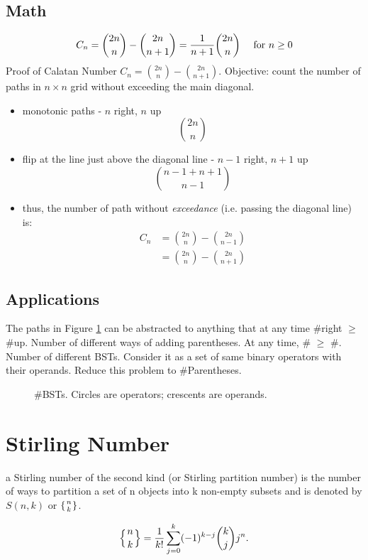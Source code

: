 \subsection{Math}
$$
C_n = {2n\choose n} - {2n\choose n+1} = {1\over n+1}{2n\choose n} \quad\text{ for }n\ge 0
$$
 Proof of Calatan Number $C_n ={2n\choose n} - {2n\choose n+1}$. Objective: count the number of paths in $n\times n$ grid without exceeding the main diagonal. 
\begin{itemize}
\begin{figure}[]
    \centerline{\texttt{[image: catalan\_proof]}}
    \caption{Monotonic Paths}
  \label{fig:catalanProof}
\end{figure}
\item monotonic paths - $n$ right, $n$ up
$$
{2n\choose n}
$$
\item flip at the line just above the diagonal line - $n-1$ right, $n+1$ up
$$
{n-1+n+1\choose n-1}
$$
\item thus, the number of path without \textit{exceedance} (i.e. passing the diagonal line) is: 
\begin{align*}
C_n &= {2n\choose n} - {2n\choose n-1}\\ 
&={2n\choose n} - {2n\choose n+1}
\end{align*}
\end{itemize}

\subsection{Applications}
The paths in Figure \ref{fig:catalanProof} can be abstracted to anything that at any time \#right $\geq$ \#up. 
Number of different ways of adding parentheses. At any time, \#\pyinline{(} $\geq$ \#\pyinline{)}.
Number of different BSTs. Consider it as a set of same binary operators with their operands. Reduce this problem to \#Parentheses. 
\begin{figure}[hbtp]
\centering
{}
\caption{\#BSTs. Circles are operators; crescents are operands.}
\label{fig:NumberOfBSTs}
\end{figure}

\section{Stirling Number}
a Stirling number of the second kind (or Stirling partition number) is the number of ways to partition a set of n objects into k non-empty subsets and is denoted by $S(n,k)$ or  $\lbrace{n\atop k}\rbrace$.

$$
\left\{ {n \atop k}\right\} = \frac{1}{k!}\sum_{j=0}^{k} (-1)^{k-j} \binom{k}{j} j^n.
$$
